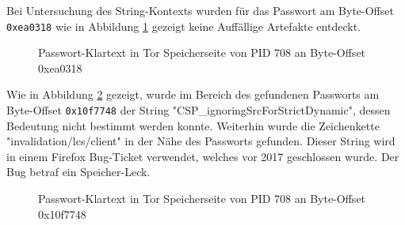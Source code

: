 Bei Untersuchung des String-Kontexts wurden für das Passwort am Byte-Offset \texttt{0xea0318} wie in Abbildung \ref{img:tor-pw-offset-pid-708-0xea0318} gezeigt keine Auffällige Artefakte entdeckt.
\begin{figure}[h!]
	\centerline{}
	\label{img:tor-pw-offset-pid-708-0xea0318}  
	\caption{Passwort-Klartext in Tor Speicherseite von PID 708 an Byte-Offset 0xea0318}
\end{figure}

Wie in Abbildung \ref{img:tor-pw-offset-pid-708-0x10f7748} gezeigt, wurde im Bereich des gefundenen Passworts am Byte-Offset \texttt{0x10f7748} der String "CSP\_ignoringSrcForStrictDynamic", dessen Bedeutung nicht bestimmt werden konnte.
Weiterhin wurde die Zeichenkette "invalidation/lcs/client" in der Nähe des Passworts gefunden. Dieser String wird in einem Firefox Bug-Ticket verwendet, welches vor 2017 geschlossen wurde. Der Bug betraf ein Speicher-Leck.
\begin{figure}[h!]
	\centerline{}
	\label{img:tor-pw-offset-pid-708-0x10f7748}  
	\caption{Passwort-Klartext in Tor Speicherseite von PID 708 an Byte-Offset 0x10f7748}
\end{figure}
	
